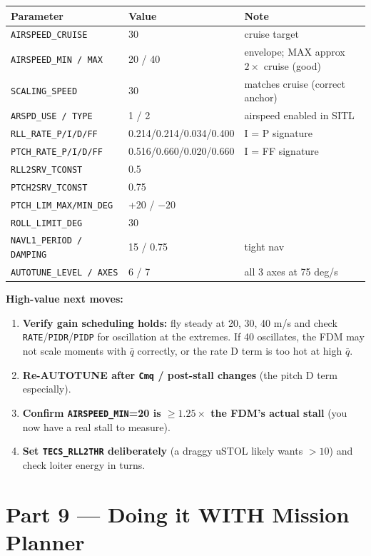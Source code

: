 \documentclass[11pt,a4paper]{article}
\newcommand{\pp}[1]{\texttt{#1}} %
\begin{document}
\begin{longtable}{@{}p{4.2cm}p{2.6cm}p{6.8cm}@{}}
\toprule
\textbf{Parameter} & \textbf{Value} & \textbf{Note}\\
\midrule
\endhead
\pp{AIRSPEED\_CRUISE} & 30 & cruise target\\
\pp{AIRSPEED\_MIN / MAX} & 20 / 40 & envelope; MAX approx $2\times$ cruise (good)\\
\pp{SCALING\_SPEED} & 30 & matches cruise (correct anchor)\\
\pp{ARSPD\_USE / TYPE} & 1 / 2 & airspeed enabled in SITL\\
\pp{RLL\_RATE\_P/I/D/FF} & 0.214/0.214/0.034/0.400 & I = P signature\\
\pp{PTCH\_RATE\_P/I/D/FF} & 0.516/0.660/0.020/0.660 & I = FF signature\\
\pp{RLL2SRV\_TCONST} & 0.5 & \\
\pp{PTCH2SRV\_TCONST} & 0.75 & \\
\pp{PTCH\_LIM\_MAX/MIN\_DEG} & +20 / $-20$ & \\
\pp{ROLL\_LIMIT\_DEG} & 30 & \\
\pp{NAVL1\_PERIOD / DAMPING} & 15 / 0.75 & tight nav\\
\pp{AUTOTUNE\_LEVEL / AXES} & 6 / 7 & all 3 axes at 75 deg/s\\
\bottomrule
\end{longtable}

\textbf{High-value next moves:}
\begin{enumerate}[leftmargin=1.6em]
  \item \textbf{Verify gain scheduling holds:} fly steady at 20, 30, 40 m/s and
  check \pp{RATE}/\pp{PIDR}/\pp{PIDP} for oscillation at the extremes. If 40
  oscillates, the FDM may not scale moments with $\bar q$ correctly, or the rate
  D term is too hot at high $\bar q$.
  \item \textbf{Re-AUTOTUNE after \pp{Cmq} / post-stall changes} (the pitch D term
  especially).
  \item \textbf{Confirm \pp{AIRSPEED\_MIN}=20 is $\geq 1.25\times$ the FDM's actual
  stall} (you now have a real stall to measure).
  \item \textbf{Set \pp{TECS\_RLL2THR} deliberately} (a draggy uSTOL likely wants
  $>10$) and check loiter energy in turns.
\end{enumerate}

\section{Part 9 --- Doing it WITH Mission Planner}
\end{document}
